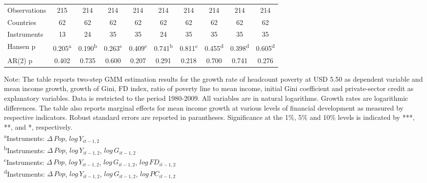 \documentclass[12pt, a4paper]{article}
\begin{document}
\begin{table}
\begin{threeparttable}
{\begin{tabular}{l*{9}{c}}
				\hline
				Observations        &         215         &         214         &         214         &         214         &         214         &         214         &         214         &         214         &         214         \\
				Countries           &          62         &          62         &          62         &          62         &          62         &          62         &          62         &          62         &          62         \\
				Instruments         &          13         &          24         &          35         &          35         &          24         &          35         &          35         &          35         &          35         \\
				Hansen p         &       0.205\textsuperscript{a}         &       0.190\textsuperscript{b}         &       0.263\textsuperscript{c}         &       0.409\textsuperscript{c}         &       0.741\textsuperscript{b}         &       0.811\textsuperscript{c}         &       0.455\textsuperscript{d}         &       0.398\textsuperscript{d}         &       0.605\textsuperscript{d}         \\
				AR(2) p               &       0.402         &       0.735         &       0.600         &       0.207         &       0.291         &       0.218         &       0.700         &       0.741         &       0.276         \\
				\hline\hline
			\end{tabular}
		}
		\begin{tablenotes}
			\item \scriptsize{Note: The table reports two-step GMM estimation results for the growth rate of headcount poverty at USD 5.50 as dependent variable and mean income growth, growth of Gini, FD index, ratio of poverty line to mean income, initial Gini coefficient and private-sector credit as explanatory variables. Data is restricted to the period 1980-2009. All variables are in natural logarithms. Growth rates are logarithmic differences. The table also reports marginal effects for mean income growth at various levels of financial development as measured by respective indicators. Robust standard errors are reported in parantheses. Significance at the 1\%, 5\% and 10\% levels is indicated by ***, **, and *, respectively.\\
				\textsuperscript{a}Instruments: $\Delta \, Pop$, $log \, Y_{it-1,2}$}\\
			\textsuperscript{b}Instruments: $\Delta \, Pop$, $log \, Y_{it-1,2}$, $log \, G_{it-1,2}$\\
			\textsuperscript{c}Instruments: $\Delta \, Pop$, $log \, Y_{it-1,2}$, $log \, G_{it-1,2}$, $log \, FD_{it-1,2}$\\
			\textsuperscript{d}Instruments: $\Delta \, Pop$, $log \, Y_{it-1,2}$, $log \, G_{it-1,2}$, $log \, PC_{it-1,2}$\\
			

\end{tablenotes}
\end{threeparttable}
\end{table}
\end{document}
